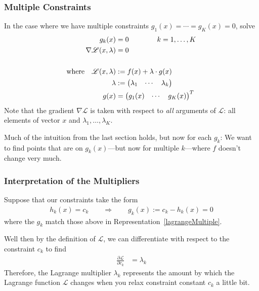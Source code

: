 \documentclass[12pt]{article}
\numberwithin{equation}{section} %
\theoremstyle{plain}
\theoremstyle{definition}
\theoremstyle{remark}
\begin{document}
\subsubsection{Multiple Constraints}

In the case where we have multiple constraints $g_1(x)=\cdots=g_K(x)=0$,
solve
\begin{align}
  g_k(x) &= 0 \qquad\qquad k=1,\ldots,K\label{lagrangeMultiple}\\
  \nabla \mathscr{L}(x,\lambda) &= 0 \notag\\\notag\\
  \text{where} \quad
  \mathscr{L}(x,\lambda)
  &:= f(x) + \lambda \cdot g(x) \notag\\
  \lambda &:=
  \begin{pmatrix}\lambda_1 & \cdots & \lambda_k\end{pmatrix} \notag\\
  g(x) &=
  \begin{pmatrix}g_1(x) & \cdots & g_K(x)\end{pmatrix}^T \notag
\end{align}
Note that the gradient $\nabla \mathscr{L}$ is taken with respect to
\emph{all} arguments of $\mathscr{L}$: all elements of vector $x$ and
$\lambda_1,\ldots,\lambda_K$.

Much of the intuition from the last section holds, but now for each
$g_k$: We want to find points that are on $g_k(x)$---but now for
multiple $k$---where $f$ doesn't change very much.

\subsubsection{Interpretation of the Multipliers}

Suppose that our constraints take the form
\begin{align*}
  h_k(x) = c_k
  \qquad \Rightarrow \qquad
  g_k(x) := c_k-h_k(x) = 0
\end{align*}
where the $g_k$ match those above in
Representation~\ref{lagrangeMultiple}.

Well then by the definition of $\mathscr{L}$, we can differentiate with respect to the constraint $c_k$ to find
\begin{align*}
  \frac{\partial\mathscr{L}}{\partial c_k}
  &= \lambda_k
\end{align*}
Therefore, the Lagrange multiplier $\lambda_k$ represents the amount by
which the Lagrange function $\mathscr{L}$ changes when you relax
constraint constant $c_k$ a little bit.
\end{document}
